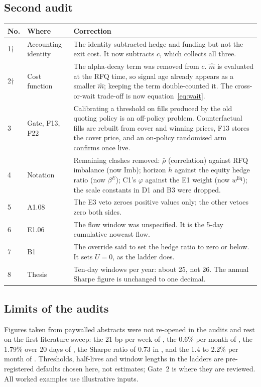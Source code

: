 \documentclass[11pt,letterpaper]{article}
\newcommand{\Imb}{\mathrm{Imb}}
\begin{document}
\subsection{Second audit}
{\small
\begin{longtable}{@{}p{}p{}p{}@{}}
\toprule
No. & Where & Correction \\
\midrule
\endhead
1$\dagger$ & Accounting identity & The identity subtracted hedge and funding but not the exit cost. It now subtracts $c$, which collects all three. \\
2$\dagger$ & Cost function & The alpha-decay term was removed from $c$. $\hat m$ is evaluated at the RFQ time, so signal age already appears as a smaller $\hat m$; keeping the term double-counted it. The cross-or-wait trade-off is now equation~\eqref{eq:wait}. \\
3 & Gate, F13, F22 & Calibrating a threshold on fills produced by the old quoting policy is an off-policy problem. Counterfactual fills are rebuilt from cover and winning prices, F13 stores the cover price, and an on-policy randomised arm confirms once live. \\
4 & Notation & Remaining clashes removed: $\bar\rho$ (correlation) against RFQ imbalance (now $\Imb$); horizon $h$ against the equity hedge ratio (now $\beta^{E}$); C1's $\varphi$ against the E1 weight (now $w^{\mathrm{liq}}$); the scale constants in D1 and B3 were dropped. \\
5 & A1.08 & The E3 veto zeroes positive values only; the other vetoes zero both sides. \\
6 & E1.06 & The flow window was unspecified. It is the 5-day cumulative nowcast flow. \\
7 & B1 & The override said to set the hedge ratio to zero or below. It sets $U=0$, as the ladder does. \\
8 & Thesis & Ten-day windows per year: about 25, not 26. The annual Sharpe figure is unchanged to one decimal. \\
\bottomrule
\end{longtable}
}

\subsection{Limits of the audits}
Figures taken from paywalled abstracts were not re-opened in the audits and rest on the first literature sweep: the 21 bp per week of \cite{fn2024}, the 0.6\% per month of \cite{cgxz2023}, the 1.79\% over 20 days of \cite{klz2016}, the Sharpe ratio of 0.73 in \cite{nqx}, and the 1.4 to 2.2\% per month of \cite{am2020}. Thresholds, half-lives and window lengths in the ladders are pre-registered defaults chosen here, not estimates; Gate~2 is where they are reviewed. All worked examples use illustrative inputs.
\end{document}
